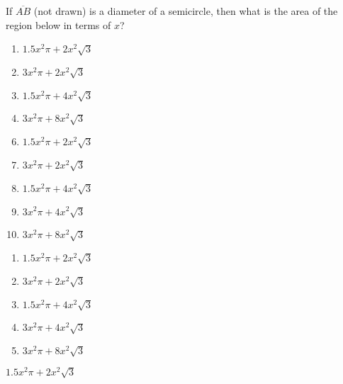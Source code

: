 


  If $\overline{AB}$ (not drawn) is a diameter of a semicircle, then what is the area of the region below in terms of $x$?
\begin{center}
\end{center}



\ifsat
	\begin{enumerate}[label=\Alph*)]
		\item   $1.5x^{2}\pi+2x^{2}\sqrt{3}$ %
		\item  $3x^{2}\pi+2x^{2}\sqrt{3}$
		\item  $1.5x^{2}\pi+4x^{2}\sqrt{3}$ 
		\item  $3x^{2}\pi+8x^{2}\sqrt{3}$
	\end{enumerate}
\else
\fi

\ifacteven
	\begin{enumerate}[label=\textbf{\Alph*.},itemsep=\fill,align=left]
		\setcounter{enumii}{5}
		\item   $1.5x^{2}\pi+2x^{2}\sqrt{3}$ %
		\item  $3x^{2}\pi+2x^{2}\sqrt{3}$
		\item  $1.5x^{2}\pi+4x^{2}\sqrt{3}$ 
		\addtocounter{enumii}{1}
		\item  $3x^{2}\pi+4x^{2}\sqrt{3}$
		\item  $3x^{2}\pi+8x^{2}\sqrt{3}$
	\end{enumerate}
\else
\fi

\ifactodd
	\begin{enumerate}[label=\textbf{\Alph*.},itemsep=\fill,align=left]
		\item   $1.5x^{2}\pi+2x^{2}\sqrt{3}$ %
		\item  $3x^{2}\pi+2x^{2}\sqrt{3}$
		\item  $1.5x^{2}\pi+4x^{2}\sqrt{3}$ 
		\item  $3x^{2}\pi+4x^{2}\sqrt{3}$
		\item  $3x^{2}\pi+8x^{2}\sqrt{3}$
	\end{enumerate}
\else
\fi

\ifgridin
   $1.5x^{2}\pi+2x^{2}\sqrt{3}$ %
		
\else
\fi

